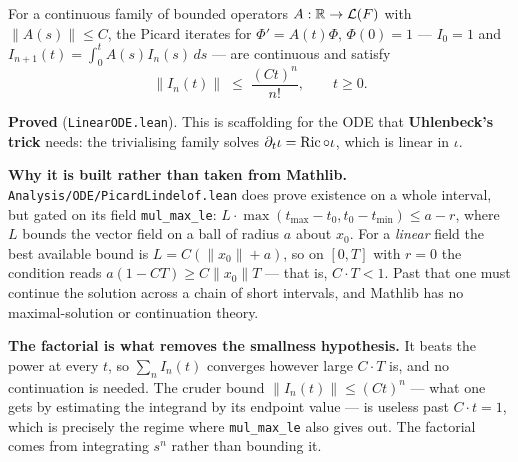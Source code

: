 \begin{lemma}
  \label{lem:dyson-iterates}
  \leanok
  For a continuous family of bounded operators $A : \mathbb{R} \to \mathcal{L}(F)$ with
  $\|A(s)\| \le C$, the Picard iterates for $\Phi' = A(t)\Phi$, $\Phi(0) = 1$ ---
  $I_0 = 1$ and $I_{n+1}(t) = \int_0^t A(s) I_n(s)\,ds$ --- are continuous and satisfy
  \[
    \|I_n(t)\| \;\le\; \frac{(Ct)^n}{n!}, \qquad t \ge 0 .
  \]

  \textbf{Proved} (\texttt{LinearODE.lean}). This is scaffolding for the ODE that
  \textbf{Uhlenbeck's trick} needs: the trivialising family solves
  $\partial_t \iota = \operatorname{Ric} \circ \iota$, which is linear in $\iota$.

  \textbf{Why it is built rather than taken from Mathlib.}
  \texttt{Analysis/ODE/PicardLindelof.lean} does prove existence on a whole interval, but
  gated on its field \texttt{mul\_max\_le}: $L \cdot \max(t_{\max} - t_0, t_0 - t_{\min})
  \le a - r$, where $L$ bounds the vector field on a ball of radius $a$ about $x_0$. For a
  \emph{linear} field the best available bound is $L = C(\|x_0\| + a)$, so on $[0,T]$ with
  $r = 0$ the condition reads $a(1 - CT) \ge C\|x_0\|T$ --- that is, \textbf{$C \cdot T < 1$}.
  Past that one must continue the solution across a chain of short intervals, and Mathlib has
  no maximal-solution or continuation theory.

  \textbf{The factorial is what removes the smallness hypothesis.} It beats the power at
  every $t$, so $\sum_n I_n(t)$ converges however large $C\cdot T$ is, and no continuation is
  needed. The cruder bound $\|I_n(t)\| \le (Ct)^n$ --- what one gets by estimating the
  integrand by its endpoint value --- is useless past $C \cdot t = 1$, which is precisely the
  regime where \texttt{mul\_max\_le} also gives out. The factorial comes from integrating
  $s^n$ rather than bounding it.
\end{lemma}


